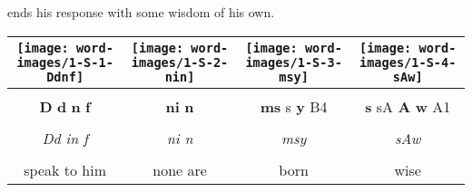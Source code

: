 \vspace*{\fill}

\pagebreak

\vspace*{\fill}

 ends his response with some wisdom of his own.

\vspace*{\fill}

\vspace*{\fill}

\pagebreak


\vspace*{\fill}

\begin{tabularx}{\linewidth}{cccc}
	\texttt{[image: word-images/1-S-1-Ddnf]} &
	\texttt{[image: word-images/1-S-2-nin]} &
	\texttt{[image: word-images/1-S-3-msy]} &
	\texttt{[image: word-images/1-S-4-sAw]} \\
	\hline \\ 
	\textbf{D} \textbf{d} \textbf{n} \textbf{f} &
	\textbf{ni} \textbf{n} &
	\textbf{ms} s \textbf{y} B4 &
	\textbf{s} sA \textbf{A} \textbf{w} A1 \\
	\hline \\ 
	\textit{Dd in f} & \textit{ni n} & \textit{msy} & \textit{sAw} \\
	\hline \\ 
	speak to him & none are & born & wise
\end{tabularx}

\vspace*{\fill}

\pagebreak

